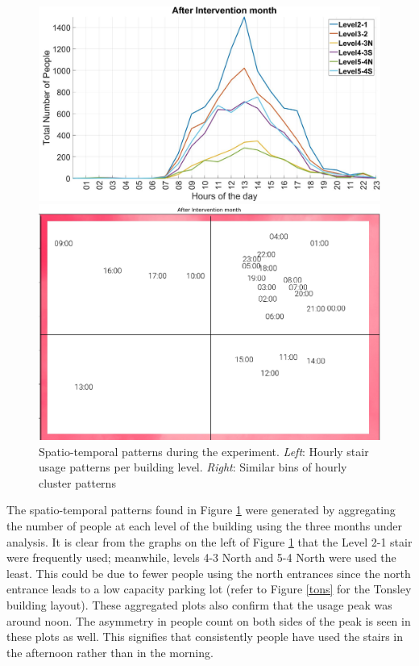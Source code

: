 \begin{figure}[htb]
    \begin{minipage}[b]{0.5\textwidth}
    \includegraphics[width=\textwidth]{image/Chapters/Chapter6/after_int.jpg}%
    \end{minipage}
    \begin{minipage}[b]{0.39\textwidth}
    \includegraphics[width=\textwidth]{image/Chapters/Chapter6/timeseriesafter.png}
    \end{minipage}
    \caption{Spatio-temporal patterns during the experiment. \textit{Left}: Hourly stair usage patterns per building level. \textit{Right}: Similar bins of hourly cluster patterns}
    \label{spa1}
\end{figure}

The spatio-temporal patterns found in Figure \ref{spa1} were generated by aggregating the number of people at each level of the building using the three months under analysis. It is clear from the graphs on the left of Figure \ref{spa1} that the Level 2-1 stair were frequently used; meanwhile, levels 4-3 North and 5-4 North were used the least. This could be due to fewer people using the north entrances since the north entrance leads to a low capacity parking lot (refer to Figure \ref{tons} for the Tonsley building layout). These aggregated plots also confirm that the usage peak was around noon. The asymmetry in people count on both sides of the peak is seen in these plots as well. This signifies that consistently people have used the stairs in the afternoon rather than in the morning. 

